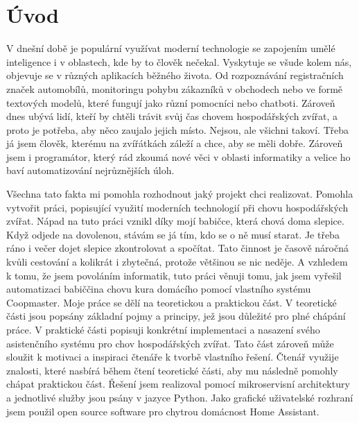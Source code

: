 \chapter{Úvod}\label{ch:uvod}

V dnešní době je populární využívat moderní technologie se zapojením umělé inteligence i v oblastech, kde by to člověk nečekal.
Vyskytuje se všude kolem nás, objevuje se v různých aplikacích běžného života.
Od rozpoznávání registračních značek automobílů, monitoringu pohybu zákazníků v obchodech nebo ve formě textových modelů, které fungují jako různí pomocníci nebo chatboti.
Zároveň dnes ubývá lidí, kteří by chtěli trávit svůj čas chovem hospodářských zvířat, a proto je potřeba, aby něco zaujalo jejich místo.
Nejsou, ale všichni takoví.
Třeba já jsem člověk, kterému na zvířátkách záleží a chce, aby se měli dobře.
Zároveň jsem i programátor, který rád zkoumá nové věci v oblasti informatiky a velice ho baví automatizování nejrůznějších úloh. \par
Všechna tato fakta mi pomohla rozhodnout jaký projekt chci realizovat.
Pomohla vytvořit práci, popisující využití moderních technologií při chovu hospodářských zvířat.
Nápad na tuto práci vznikl díky mojí babičce, která chová doma slepice.
Když odjede na dovolenou, stávám se já tím, kdo se o ně musí starat.
Je třeba ráno i večer dojet slepice zkontrolovat a spočítat.
Tato činnost je časově náročná kvůli cestování a kolikrát i zbytečná, protože většinou se nic neděje.
A vzhledem k tomu, že jsem povoláním informatik, tuto práci věnuji tomu, jak jsem vyřešil automatizaci babiččina chovu kura domácího pomocí vlastního systému Coopmaster.\newline
Moje práce se dělí na teoretickou a praktickou část.
V teoretické části jsou popsány základní pojmy a principy, jež jsou důležité pro plné chápání práce.
V praktické části popisuji konkrétní implementaci a nasazení svého asistenčního systému pro chov hospodářských zvířat.
Tato část zároveň může sloužit k motivaci a inspiraci čtenáře k tvorbě vlastního řešení.
Čtenář využije znalosti, které nasbírá během čtení teoretické části, aby mu následně pomohly chápat praktickou část.\newline
Řešení jsem realizoval pomocí mikroservisní architektury a jednotlivé služby jsou psány v jazyce Python.
Jako grafické uživatelské rozhraní jsem použil open source software pro chytrou domácnost Home Assistant.
